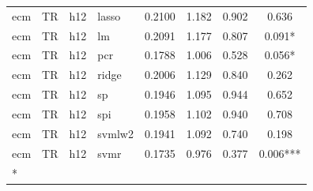 \begin{ThreePartTable}
\begin{longtable}[t]{llclcccc}
ecm & TR & h12 & lasso & 0.2100 & 1.182 & 0.902 & 0.636\\
ecm & TR & h12 & lm & 0.2091 & 1.177 & 0.807 & 0.091*\\
ecm & TR & h12 & pcr & 0.1788 & 1.006 & 0.528 & 0.056*\\
ecm & TR & h12 & ridge & 0.2006 & 1.129 & 0.840 & 0.262\\
ecm & TR & h12 & sp & 0.1946 & 1.095 & 0.944 & 0.652\\
ecm & TR & h12 & spi & 0.1958 & 1.102 & 0.940 & 0.708\\
ecm & TR & h12 & svmlw2 & 0.1941 & 1.092 & 0.740 & 0.198\\
ecm & TR & h12 & svmr & 0.1735 & 0.976 & 0.377 & 0.006***\\*
\end{longtable}
\end{ThreePartTable}
\endgroup{}

